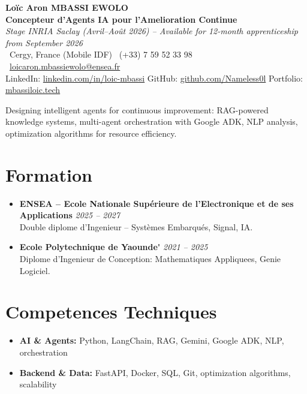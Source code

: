\documentclass[a4paper,11pt]{article}
\begin{document}
\begin{center}
    {\Large \textbf{Lo\"ic Aron MBASSI EWOLO}} \\ \vspace{4pt}
    \textbf{\large Concepteur d'Agents IA pour l'Amelioration Continue} \\
    \textit{\small Stage INRIA Saclay (Avril--Ao\^ut 2026) -- Available for 12-month apprenticeship from September 2026} \\ \vspace{4pt}
    \small
    \Pointinghand\ Cergy, France (Mobile IDF) \quad
    \Mobilefone\ (+33) 7 59 52 33 98 \quad
    {\color{primary}\Letter\ \href{mailto:loicaron.mbassiewolo@ensea.fr}{loicaron.mbassiewolo@ensea.fr}} \\ \vspace{2pt}
    {\color{primary}LinkedIn: \href{https://www.linkedin.com/in/loic-mbassi/}{linkedin.com/in/loic-mbassi}} \quad
    {\color{primary}GitHub: \href{https://github.com/Nameless0l}{github.com/Nameless0l}} \quad
    {\color{primary}Portfolio: \href{https://mbassiloic.tech}{mbassiloic.tech}}
\end{center}

\vspace{-6pt}

\noindent\small{Designing intelligent agents for continuous improvement: RAG-powered knowledge systems, multi-agent orchestration with Google ADK, NLP analysis, optimization algorithms for resource efficiency.}

\section{Formation}
\begin{itemize}[leftmargin=*, label=\tiny$\bullet$, nosep]
    \item \textbf{ENSEA -- Ecole Nationale Sup\'erieure de l'Electronique et de ses Applications} \hfill \textit{2025 -- 2027} \\
    \small{Double diplome d'Ingenieur -- Syst\`emes Embarqu\'es, Signal, IA.}
    \item \textbf{Ecole Polytechnique de Yaounde\'} \hfill \textit{2021 -- 2025} \\
    \small{Diplome d'Ingenieur de Conception: Mathematiques Appliquees, Genie Logiciel.}
\end{itemize}

\section{Competences Techniques}
\begin{itemize}[leftmargin=*, nosep]
    \item \small{\textbf{AI \& Agents:} Python, LangChain, RAG, Gemini, Google ADK, NLP, orchestration}
    \item \small{\textbf{Backend \& Data:} FastAPI, Docker, SQL, Git, optimization algorithms, scalability}
\end{itemize}
\end{document}
